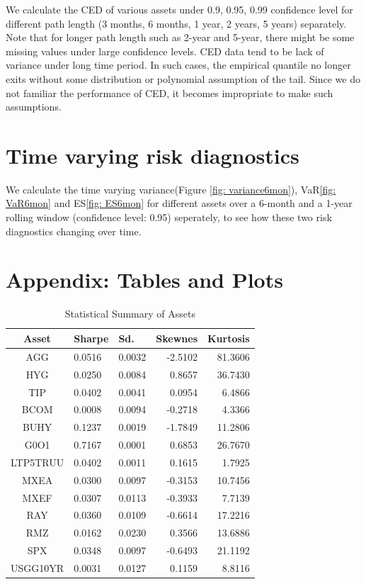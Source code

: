 \documentclass[12pt]{article}
\begin{document}
We calculate the CED of various assets under 0.9, 0.95, 0.99 confidence level for different path length (3 months, 6 months, 1 year, 2 years, 5 years) separately. Note that for longer path length such as 2-year and 5-year, there might be some missing values under large confidence levels. CED data tend to be lack of variance under long time period. In such cases, the empirical quantile no longer exits without some distribution or polynomial assumption of the tail. Since we do not familiar the performance of CED, it becomes impropriate to make such assumptions.

\section{Time varying risk diagnostics}

We calculate the time varying variance(Figure \ref{fig: variance6mon}), VaR\ref{fig: VaR6mon} and ES\ref{fig: ES6mon}  for different assets over a 6-month and a 1-year rolling window (confidence level: 0.95) seperately, to see how these two risk diagnostics changing over time. 


\section{Appendix: Tables and Plots}


\begin{table}[!h]
\caption{Statistical Summary of Assets} %
\centering 
\begin{tabular}{ | c || p{1.5cm} p{1.5cm} r r | } 
 \hline
Asset & Sharpe  & Sd. & Skewnes & Kurtosis \\
  \hline \hline
AGG & 0.0516 & 0.0032 & -2.5102 & 81.3606\\ 
HYG & 0.0250 & 0.0084 &  0.8657 & 36.7430\\ 
TIP & 0.0402 & 0.0041 &  0.0954 &  6.4866\\ 
BCOM & 0.0008 & 0.0094 & -0.2718 &  4.3366\\ 
BUHY & 0.1237 & 0.0019 & -1.7849 & 11.2806\\ 
G0O1 & 0.7167 & 0.0001 &  0.6853 & 26.7670\\ 
LTP5TRUU & 0.0402 & 0.0011 &  0.1615 &  1.7925\\ 
MXEA & 0.0300 & 0.0097 & -0.3153 & 10.7456\\ 
MXEF & 0.0307 & 0.0113 & -0.3933 &  7.7139\\ 
RAY & 0.0360 & 0.0109 & -0.6614 & 17.2216\\ 
RMZ & 0.0162 & 0.0230 &  0.3566 & 13.6886\\ 
SPX & 0.0348 & 0.0097 & -0.6493 & 21.1192\\ 
USGG10YR & 0.0031 & 0.0127 &  0.1159 &  8.8116 \\
 \hline
\end{tabular}
\label{table:statSum}
\end{table}
\end{document}
